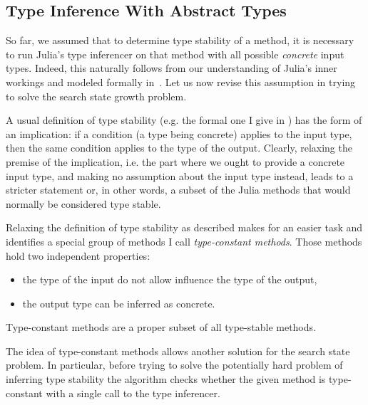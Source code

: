 

\subsection{Type Inference With Abstract Types}%
\label{ssec:approx:space:abstract}

So far, we assumed that to determine type stability of a method, it is necessary
to run Julia's type inferencer on that method with all possible \emph{concrete} input
types. Indeed, this naturally follows from our understanding of Julia's inner
workings and modeled formally in~. Let us now revise this
assumption in trying to solve the search state growth problem.

A usual definition of type stability (e.g. the formal one I give in
) has the form of an implication: if a condition (a type
being concrete) applies to the input type, then the same condition applies to
the type of the output. Clearly, relaxing the premise of the implication, i.e.
the part where we ought to provide a concrete input type, and making no
assumption about the input type instead, leads to a stricter statement or, in
other words, a subset of the Julia methods that would normally be considered
type stable.

Relaxing the definition of type stability as described makes for an easier task
and identifies a special group of methods I call \emph{type-constant methods}.
Those methods hold two independent properties:
\begin{itemize}
  \item the type of the input do not allow influence the type of the output,
  \item the output type can be inferred as concrete.
\end{itemize}
Type-constant methods are a proper subset of all type-stable methods.

The idea of type-constant methods allows another solution for the search state
problem. In particular, before trying to solve the potentially hard problem of
inferring type stability the algorithm checks whether the given method is
type-constant with a single call to the type inferencer.

